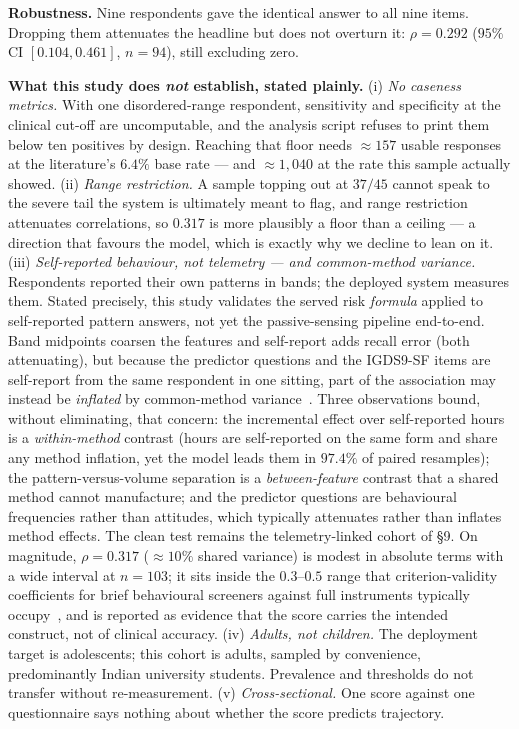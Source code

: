 \documentclass[11pt,a4paper]{article}
\begin{document}
\textbf{Robustness.} Nine respondents gave the identical answer to all nine
items. Dropping them attenuates the headline but does not overturn it:
$\rho = 0.292$ ($95\%$ CI $[0.104, 0.461]$, $n{=}94$), still excluding zero.

\textbf{What this study does \emph{not} establish, stated plainly.}
(i) \emph{No caseness metrics.} With one disordered-range respondent, sensitivity
and specificity at the clinical cut-off are uncomputable, and the analysis script
refuses to print them below ten positives by design. Reaching that floor needs
$\approx$$157$ usable responses at the literature's $6.4\%$ base rate ---
and $\approx$$1{,}040$ at the rate this sample actually showed.
(ii) \emph{Range restriction.} A sample topping out at $37/45$ cannot speak to
the severe tail the system is ultimately meant to flag, and range restriction
attenuates correlations, so $0.317$ is more plausibly a floor than a ceiling ---
a direction that favours the model, which is exactly why we decline to lean on it.
(iii) \emph{Self-reported behaviour, not telemetry --- and common-method
variance.} Respondents reported their own patterns in bands; the deployed
system measures them. Stated precisely, this study validates the served risk
\emph{formula} applied to self-reported pattern answers, not yet the
passive-sensing pipeline end-to-end. Band midpoints coarsen the features and
self-report adds recall error (both attenuating), but because the predictor
questions and the IGDS9-SF items are self-report from the same respondent in one
sitting, part of the association may instead be \emph{inflated} by
common-method variance~\cite{podsakoff2003}. Three observations bound, without
eliminating, that concern: the incremental effect over self-reported hours is a
\emph{within-method} contrast (hours are self-reported on the same form and
share any method inflation, yet the model leads them in $97.4\%$ of paired
resamples); the pattern-versus-volume
separation is a \emph{between-feature} contrast that a shared method cannot
manufacture; and the predictor questions are behavioural frequencies rather than
attitudes, which typically attenuates rather than inflates method effects. The
clean test remains the telemetry-linked cohort of \S9. On magnitude,
$\rho{=}0.317$ ($\approx$$10\%$ shared variance) is modest in absolute terms with a
wide interval at $n{=}103$; it sits inside the $0.3$--$0.5$ range that
criterion-validity coefficients for brief behavioural screeners against full
instruments typically occupy~\cite{kroenke2003,cohen1988}, and is reported as
evidence that the score carries the intended construct, not of clinical accuracy.
(iv) \emph{Adults, not children.} The deployment target is adolescents; this
cohort is adults, sampled by convenience, predominantly Indian university
students. Prevalence and thresholds do not transfer without re-measurement.
(v) \emph{Cross-sectional.} One score against one questionnaire says nothing
about whether the score predicts trajectory.
\end{document}
